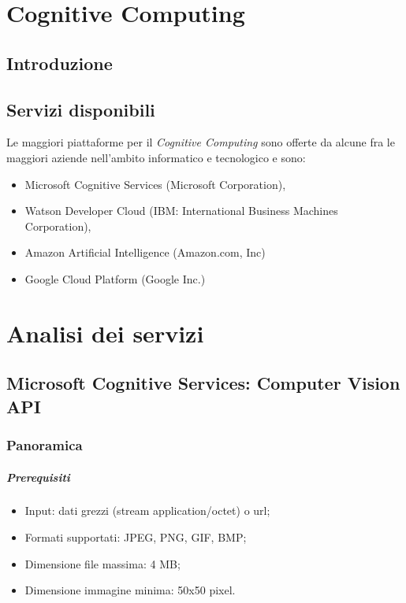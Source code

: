 \documentclass[fleqn,a4paper,11pt]{report}
\begin{document}
{\let\clearpage\relax \chapter{Cognitive Computing}}
\section{Introduzione}

\section{Servizi disponibili}
Le maggiori piattaforme per il \textit{Cognitive Computing} sono offerte da alcune fra le maggiori aziende nell'ambito informatico e tecnologico e sono:
\begin{itemize}
\item Microsoft Cognitive Services\cite{mcs-link} (Microsoft Corporation),
\item Watson Developer Cloud (IBM: International Business Machines Corporation),
\item Amazon Artificial Intelligence (Amazon.com, Inc)
\item Google Cloud Platform (Google Inc.)
\end{itemize}



{\let\clearpage\relax \chapter{Analisi dei servizi}}
\section{Microsoft Cognitive Services: Computer Vision API}
\subsection{Panoramica}
\paragraph{Prerequisiti}
\begin{itemize}
\item Input: dati grezzi (stream application/octet) o url;
\item Formati supportati: JPEG, PNG, GIF, BMP;
\item Dimensione file massima: 4 MB;
\item Dimensione immagine minima: 50x50 pixel. 
\end{itemize}
%
\end{document}

